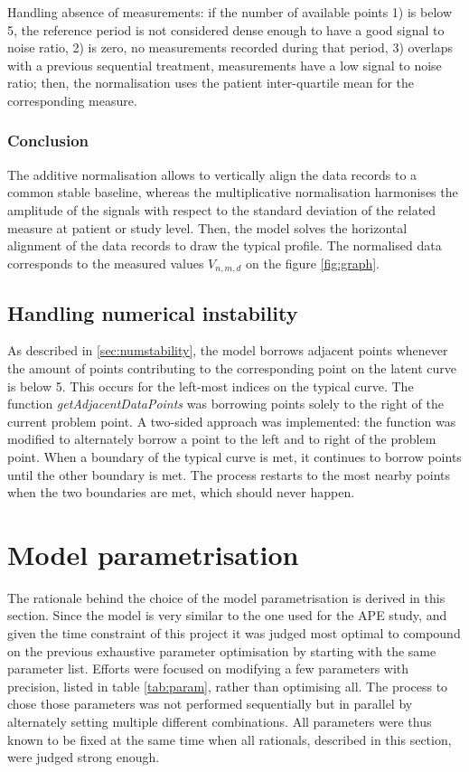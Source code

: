 Handling absence of measurements: if the number of available points 1) is below 5, the reference period is not considered dense enough to have a good signal to noise ratio, 2) is zero, no measurements recorded during that period, 3) overlaps with a previous sequential treatment, measurements have a low signal to noise ratio; then, the normalisation uses the patient inter-quartile mean for the corresponding measure.

\subsubsection{Conclusion} 
The additive normalisation allows to vertically align the data records to a common stable baseline, whereas the multiplicative normalisation harmonises the amplitude of the signals with respect to the standard deviation of the related measure at patient or study level. Then, the model solves the horizontal alignment of the data records to draw the typical profile. The normalised  data corresponds to the measured values $V_{n,m,d}$ on the figure \ref{fig:graph}.

\subsection{Handling numerical instability}
As described in \ref{sec:numstability}, the model borrows adjacent points whenever the amount of points contributing to the corresponding point on the latent curve is below 5. This occurs for the left-most indices on the typical curve. The function \textit{getAdjacentDataPoints} was borrowing points solely to the right of the current problem point. A two-sided approach was implemented: the function was modified to alternately borrow a point to the left and to right of the problem point. When a boundary of the typical curve is met, it continues to borrow points until the other boundary  is met. The process restarts to the most nearby points when the two boundaries are met, which should never happen. 

\section{Model parametrisation} \label{sec:chosenparam}
The rationale behind the choice of the model parametrisation is derived in this section. Since the model is very similar to the one used for the APE study, and given the time constraint of this project it was judged most optimal to compound on the previous exhaustive parameter optimisation by starting with the same parameter list. Efforts were focused on modifying a few parameters with precision, listed in table \ref{tab:param}, rather than optimising all. The process to chose those parameters was not performed sequentially but in parallel by alternately setting multiple different combinations. All parameters were thus known to be fixed at the same time when all rationals, described in this section, were judged strong enough.


